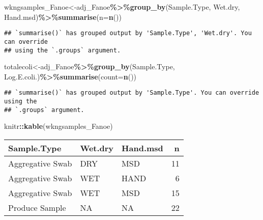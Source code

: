 \documentclass[
]{article}
\newenvironment{Shaded}{\begin{snugshade}}{\end{snugshade}}
\newcommand{\AttributeTok}[1]{\textcolor[rgb]{0.13,0.29,0.53}{#1}}
\newcommand{\FunctionTok}[1]{\textcolor[rgb]{0.13,0.29,0.53}{\textbf{#1}}}
\newcommand{\NormalTok}[1]{#1}
\newcommand{\OtherTok}[1]{\textcolor[rgb]{0.56,0.35,0.01}{#1}}
\newcommand{\SpecialCharTok}[1]{\textcolor[rgb]{0.81,0.36,0.00}{\textbf{#1}}}
\begin{document}
\begin{Shaded}
\begin{Highlighting}[]
\NormalTok{wkngsamples\_Fanoe}\OtherTok{\textless{}{-}}\NormalTok{adj\_Fanoe}\SpecialCharTok{\%\textgreater{}\%}\FunctionTok{group\_by}\NormalTok{(Sample.Type, Wet.dry, Hand.msd)}\SpecialCharTok{\%\textgreater{}\%}\FunctionTok{summarise}\NormalTok{(}\AttributeTok{n=}\FunctionTok{n}\NormalTok{())}
\end{Highlighting}
\end{Shaded}

\begin{verbatim}
## `summarise()` has grouped output by 'Sample.Type', 'Wet.dry'. You can override
## using the `.groups` argument.
\end{verbatim}

\begin{Shaded}
\begin{Highlighting}[]
\NormalTok{totalecoli}\OtherTok{\textless{}{-}}\NormalTok{adj\_Fanoe}\SpecialCharTok{\%\textgreater{}\%}\FunctionTok{group\_by}\NormalTok{(Sample.Type, Log.E.coli.)}\SpecialCharTok{\%\textgreater{}\%}\FunctionTok{summarise}\NormalTok{(}\AttributeTok{count=}\FunctionTok{n}\NormalTok{())}
\end{Highlighting}
\end{Shaded}

\begin{verbatim}
## `summarise()` has grouped output by 'Sample.Type'. You can override using the
## `.groups` argument.
\end{verbatim}

\begin{Shaded}
\begin{Highlighting}[]
\NormalTok{knitr}\SpecialCharTok{::}\FunctionTok{kable}\NormalTok{(wkngsamples\_Fanoe)}
\end{Highlighting}
\end{Shaded}

\begin{longtable}[]{@{}lllr@{}}
\toprule\noalign{}
Sample.Type & Wet.dry & Hand.msd & n \\
\midrule\noalign{}
\endhead
\bottomrule\noalign{}
\endlastfoot
Aggregative Swab & DRY & MSD & 11 \\
Aggregative Swab & WET & HAND & 6 \\
Aggregative Swab & WET & MSD & 15 \\
Produce Sample & NA & NA & 22 \\
\end{longtable}
\end{document}
